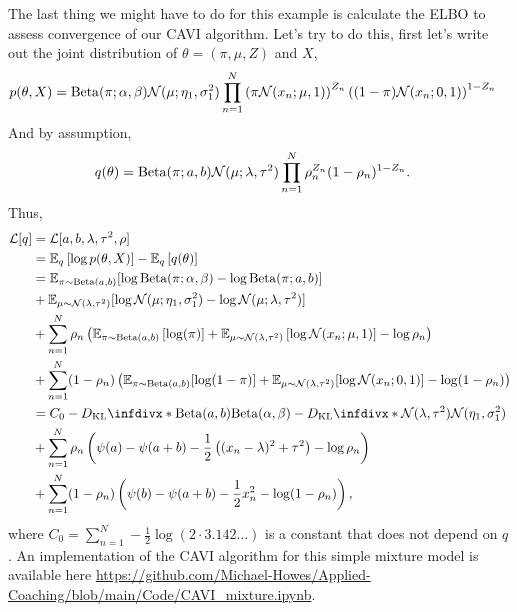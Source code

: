 The last thing we might have to do for this example is calculate the ELBO to assess convergence of our CAVI algorithm. Let's try to do this, first let's write out the joint distribution of $\theta=(\pi,\mu,Z)$ and $X$,
\begin{align*}
    p(\theta,X)&=\mathrm{Beta}(\pi;\alpha,\beta){\mathcal N}(\mu;\eta_1,\sigma_1^2)\prod_{n=1}^N \left(\pi\mathcal{N}(x_n;\mu,1)\right)^{Z_n}\left((1-\pi)\mathcal{N}(x_n;0,1)\right)^{1-Z_n}
\end{align*}
And by assumption,
\begin{align*}
    q(\theta)&=\mathrm{Beta}(\pi;a,b){\mathcal N}(\mu;\lambda,\tau^2)\prod_{n=1}^N\rho_n^{Z_n}(1-\rho_n)^{1-Z_n}.
\end{align*}
Thus,
\begin{align*}
    \mathcal{L}[q] &=\mathcal{L}[a,b,\lambda,\tau^2,\rho]\\
    &=\bbE_{q}\left[\log p(\theta,X)\right] - \bbE_q\left[q(\theta)\right]\\
    &=\bbE_{\pi \sim \mathrm{Beta}(a,b)}[\log \mathrm{Beta}(\pi;\alpha,\beta)-\log \mathrm{Beta}(\pi;a,b)] \\
    &+ \bbE_{\mu \sim \calN(\lambda,\tau^2 )}[\log \calN(\mu;\eta_1,\sigma^2_1)-\log \calN(\mu;\lambda,\tau^2)]\\
    &+\sum_{n=1}^N \rho_n\left(\bbE_{\pi \sim \mathrm{Beta}(a,b)}\left[\log(\pi)\right]+\bbE_{\mu \sim \calN(\lambda,\tau^2)}\left[\log \calN(x_n;\mu,1)\right]-\log \rho_n\right) \\
    &+\sum_{n=1}^N (1-\rho_n)\left(\bbE_{\pi \sim \mathrm{Beta}(a,b)}[\log(1-\pi)]+\bbE_{\mu \sim \calN(\lambda,\tau^2)}[\log \calN(x_n;0,1)] - \log(1-\rho_n)\right)\\
    &=C_0-\KLD{\mathrm{Beta}(a,b)}{\mathrm{Beta}(\alpha,\beta)}-\KLD{\calN(\lambda,\tau^2)}{\calN(\eta_1,\sigma_1^2)}\\
    &+\sum_{n=1}^N \rho_n\left(\psi(a)-\psi(a+b)-\frac{1}{2}\left((x_n-\lambda)^2 + \tau^2\right)-\log\rho_n\right)\\
    &+\sum_{n=1}^N (1-\rho_n)\left(\psi(b)-\psi(a+b) - \frac{1}{2}x_n^2-\log(1-\rho_n)\right),
\end{align*}
where $C_0 = \sum_{n=1}^N -\frac{1}{2}\log(2\cdot 3.142\ldots)$ is a constant that does not depend on $q$. An implementation of the CAVI algorithm for this simple mixture model is available here \url{https://github.com/Michael-Howes/Applied-Coaching/blob/main/Code/CAVI_mixture.ipynb}. 
